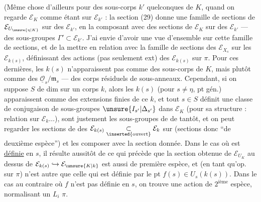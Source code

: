 (Même chose d'ailleurs pour des sous-corps $k'$ quelconques de $K$, quand on regarde $\mathcal E_K$ comme étant sur $\mathcal E_{k'}$ : la section (29) donne une famille de sections de $\mathcal E_{U_{\unsure{\eta|K}}}$ sur des $\mathcal E_{k'}$,  en la composant avec des sections de $\mathcal E_K$ sur des $\mathcal E_{k'}$ --- des sous-groupes $\Gamma'\subset\mathcal E_{k'}$. J'ai envie d'avoir une vue d'ensemble sur cette famille de sections, et de la mettre en relation avec la famille de sections des $\mathcal E_{X_s}$ sur les $\mathcal E_{k(s)}$,  définissant des actions  (pas seulement ext) des $\mathcal E_{k(s)}$ sur $\pi$. Pour ces dernières, les $k(s)$ n'apparaissent pas comme des sous-corps de $K$, mais plutôt comme des $\underline{\mathcal O}_s/\mathfrak m_s$ --- des corps résiduels de sous-anneaux. Cependant, si on suppose $S$ de dim   sur
un corps $k$, alors les $k(s)$ (pour $s\ne\eta$, pt gén.) apparaissent comme des extensions finies de ce $k$, et tout $s\in S$ définit une classe de conjugaison de sous-groupes $\unsure{I_{s'}|\Delta_{s'}}$ dans $\mathcal E_K$ (pour sa structure :   relation sur $\mathcal E_k\ldots$),   sont justement les sous-groupes  de   de tantôt, et on peut regarder les sections de   des $\mathcal E_{k(s)}\underset{\inserted{\text{ouvert}}}{\subset}\mathcal E_k$ sur (sections donc ``de deuxième espèce'') et les composer avec la section donnée. Dans le cas où   est \uline{définie} en $s$, il résulte aussitôt de ce qui précède que la section  obtenue de $\mathcal E_{U_K}$ au dessus de $\mathcal E_{k(s)}\hookrightarrow\mathcal E_{\unsure{K|k}}$ est aussi de première espèce, et  (en tant qu'op.   sur $\pi$)  n'est autre que celle qui est définie par le pt $f(s)\in U_s(k(s))$. Dans
le cas au contraire où  $f$ n'est pas définie en $s$, on trouve une  action de $2^{\text{ième}}$ espèce, normalisant un $L_i$   $\pi$.

